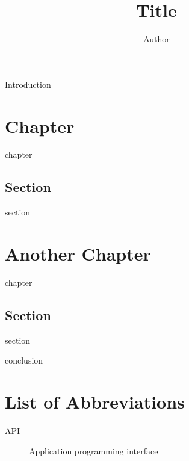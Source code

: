 \documentclass[thesis=B,english]{BPthesis}[2012/06/26]
\title{Title}
\author{Author}
\begin{document}
\begin{introduction}
	Introduction  
\end{introduction}

\chapter{Chapter}
chapter \cite{svgspec}

\section{Section} 
section

\chapter{Another Chapter}
chapter \cite{svgspec}

\section{Section} 
section

\begin{conclusion}
conclusion
\end{conclusion}




\appendix

\chapter{List of Abbreviations}

\begin{description}
	\item[API] Application programming interface
\end{description}
\end{document}
